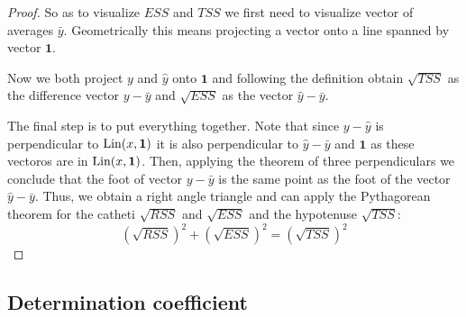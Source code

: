 \begin{proof}
So as to visualize $ESS$ and $TSS$ we first need to visualize vector of averages $\bar y$.
Geometrically this means projecting a vector onto a line spanned by vector $\mathbf{1}$.

Now we both project $y$ and $\hat y$ onto $\mathbf{1}$ and following the definition obtain $\sqrt{TSS}$ as the difference vector $y - \bar y$ and $\sqrt{ESS}$ as the vector $\hat y - \bar y$.

The final step is to put everything together.
Note that since $y - \hat y$ is perpendicular to $\operatorname{Lin}(x, \mathbf{1})$ it is also perpendicular to $\hat y - \bar y$ and $\mathbf{1}$ as these vectoros are in $\operatorname{Lin}(x, \mathbf{1})$.
Then, applying the theorem of three perpendiculars we conclude that the foot of vector $y - \bar y$ is the same point as the foot of the vector $\hat y - \bar y$.
Thus, we obtain a right angle triangle and can apply the Pythagorean theorem for the catheti $\sqrt{RSS}$ and $\sqrt{ESS}$ and the
hypotenuse $\sqrt{TSS}$:
\[
\left(\sqrt{RSS}\right)^2 + \left(\sqrt{ESS}\right)^2 = \left(\sqrt{TSS}\right)^2
\]

\end{proof}

\vspace{3.5cm}
\subsection{Determination coefficient}

